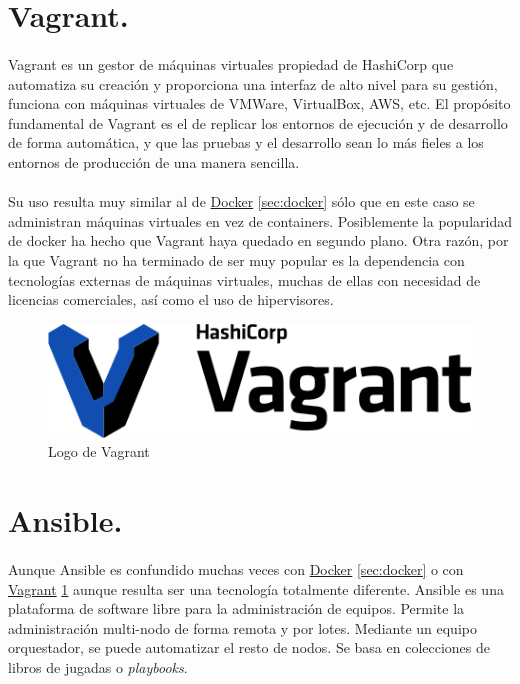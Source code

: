 \section{Vagrant.}\label{sec:vagrant}

\paragraph{}Vagrant es un gestor de máquinas virtuales propiedad de HashiCorp que automatiza
su creación y proporciona una interfaz de alto nivel para su gestión, funciona con máquinas
virtuales de VMWare, VirtualBox, AWS, etc. El propósito fundamental de Vagrant es el de
replicar los entornos de ejecución y de desarrollo de forma automática, y que las pruebas
y el desarrollo sean lo más fieles a los entornos de producción de una manera sencilla.

\paragraph{}Su uso resulta muy similar al de \hyperref[sec:docker]{Docker} \ref{sec:docker}
sólo que en este caso se administran máquinas virtuales en vez de containers. Posiblemente
la popularidad de docker ha hecho que Vagrant haya quedado en segundo plano. Otra razón,
por la que Vagrant no ha terminado de ser muy popular es la dependencia con tecnologías
externas de máquinas virtuales, muchas de ellas con necesidad de licencias comerciales,
así como el uso de hipervisores.

\begin{figure}[H]
	\centering
	\includegraphics[width=0.50\linewidth]{imgs/vagrant-logo}
	\caption[Vagrant Logo]{Logo de Vagrant}
	\label{fig:vagrant}
\end{figure}

\section{Ansible.}\label{sec:ansible}

\paragraph{}Aunque Ansible es confundido muchas veces con \hyperref[sec:docker]{Docker} \ref{sec:docker}
o con \hyperref[sec:vagrant]{Vagrant} \ref{sec:vagrant} aunque resulta ser una tecnología
totalmente diferente. Ansible es una plataforma de software libre para la administración
de equipos. Permite la administración multi-nodo de forma remota y por lotes. Mediante
un equipo orquestador, se puede automatizar el resto de nodos. Se basa en colecciones
de libros de jugadas o \emph{playbooks}.

